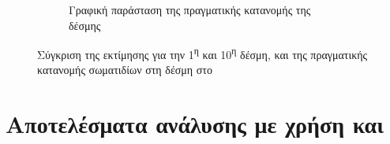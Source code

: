 \begin{figure}[tph]
\begin{subfigure}{0.8\textwidth}
		\centering
		\caption{Γραφική παράσταση της πραγματικής κατανομής της δέσμης}
		\label{fig:CST-EBS-actual-weight-function}
	\end{subfigure}
\caption{Σύγκριση της εκτίμησης για την 1\textsuperscript{η} και 10\textsuperscript{η} δέσμη, και της πραγματικής κατανομής σωματιδίων στη δέσμη στο }
\label{fig:CST-EBS-implementation}
\end{figure}


\section{Αποτελέσματα ανάλυσης με χρήση  και }




